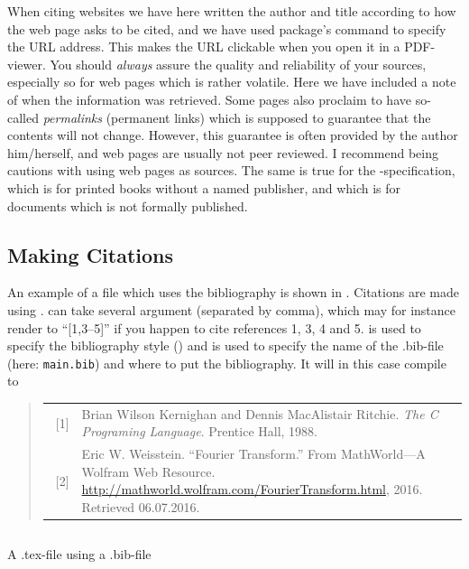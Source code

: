 {When citing websites we have here written the author and title according to how the web page asks to be cited, and we have used  package's \latexin{\url} command to specify the URL address. This makes the URL clickable when you open it in a PDF-viewer. You should \emph{always} assure the quality and reliability of your sources, especially so for web pages which is rather volatile. Here we have included a note of when the information was retrieved. Some pages also proclaim to have so-called \emph{permalinks} (permanent links) which is supposed to guarantee that the contents will not change. However, this guarantee is often provided by the author him/herself, and web pages are usually not peer reviewed. I recommend being cautions with using web pages as sources. The same is true for the -specification, which is for printed books without a named publisher, and  which is for documents which is not formally published.

\subsection{Making Citations}\label{sec:latex:citations}
An example of a file which uses the bibliography is shown in . Citations are made using \latexin{\cite}. \latexin{\cite} can take several argument (separated by comma), which may for instance render to ``[1,3--5]'' if you happen to cite references 1, 3, 4 and 5. \latexin{} is used to specify the bibliography style () and \latexin{} is used to specify the name of the .bib-file (here: \verb|main.bib|) and where to put the bibliography. It will in this case compile to

\begin{quote}
	\begin{tabular}{l p{}}
		~[1] & Brian Wilson Kernighan and Dennis MacAlistair Ritchie. \textit{The C Programing Language}. Prentice Hall, 1988. \\ 
		~[2] & Eric W. Weisstein. ``Fourier Transform.'' From MathWorld---A Wolfram Web Resource. \url{http://mathworld.wolfram.com/FourierTransform.html}, 2016. Retrieved 06.07.2016.
	\end{tabular}
\end{quote}

\begin{listing}
	\inputminted[frame=lines,linenos]{latex}{latex/bibtex.tex}
	\caption{A .tex-file using a .bib-file}
	\label{lst:latex:bibtex2}
\end{listing}

}
